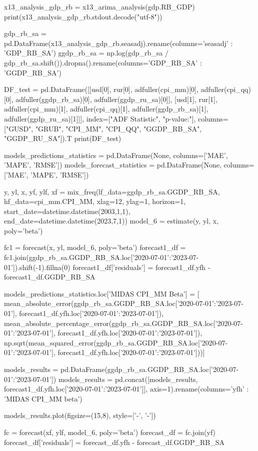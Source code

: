 \documentclass[a4paper, 12pt]{extarticle}
\numberwithin{equation}{subsection}
\begin{document}
\begin{python}
		x13_analysis_gdp_rb = x13_arima_analysis(gdp.RB_GDP)
		print(x13_analysis_gdp_rb.stdout.decode("utf-8"))
		
		gdp_rb_sa = pd.DataFrame(x13_analysis_gdp_rb.seasadj).rename(columns={'seasadj' : 'GDP_RB_SA'})
		ggdp_rb_sa = np.log(gdp_rb_sa / gdp_rb_sa.shift()).dropna().rename(columns={'GDP_RB_SA' : 'GGDP_RB_SA'})
		
		DF_test = pd.DataFrame([[usd[0], rur[0], adfuller(cpi_mm)[0], adfuller(cpi_qq)[0], adfuller(ggdp_rb_sa)[0], adfuller(ggdp_ru_sa)[0]], 
		[usd[1], rur[1], adfuller(cpi_mm)[1], adfuller(cpi_qq)[1], adfuller(ggdp_rb_sa)[1], adfuller(ggdp_ru_sa)[1]]], 
		index=["ADF Statistic", "p-value:"], 
		columns=["GUSD", "GRUB", "CPI_MM", "CPI_QQ", "GGDP_RB_SA", "GGDP_RU_SA"]).T
		print(DF_test)
		
		
		models_predictions_statistics = pd.DataFrame(None, columns=['MAE', 'MAPE', 'RMSE'])
		models_forecast_statistics = pd.DataFrame(None, columns=['MAE', 'MAPE', 'RMSE'])
		
		y, yl, x, yf, ylf, xf = mix_freq(lf_data=ggdp_rb_sa.GGDP_RB_SA, 
		hf_data=cpi_mm.CPI_MM, 
		xlag=12,  
		ylag=1, 
		horizon=1,
		start_date=datetime.datetime(2003,1,1),
		end_date=datetime.datetime(2023,7,1))
		model_6 = estimate(y, yl, x, poly='beta')
		
		fc1 = forecast(x, yl, model_6, poly='beta')
		forecast1_df = fc1.join(ggdp_rb_sa.GGDP_RB_SA.loc['2020-07-01':'2023-07-01']).shift(-1).fillna(0)
		forecast1_df['residuals'] = forecast1_df.yfh - forecast1_df.GGDP_RB_SA
		
		models_predictions_statistics.loc['MIDAS CPI_MM Beta'] = [
		mean_absolute_error(ggdp_rb_sa.GGDP_RB_SA.loc['2020-07-01':'2023-07-01'], forecast1_df.yfh.loc['2020-07-01':'2023-07-01']),
		mean_absolute_percentage_error(ggdp_rb_sa.GGDP_RB_SA.loc['2020-07-01':'2023-07-01'], forecast1_df.yfh.loc['2020-07-01':'2023-07-01']),
		np.sqrt(mean_squared_error(ggdp_rb_sa.GGDP_RB_SA.loc['2020-07-01':'2023-07-01'], forecast1_df.yfh.loc['2020-07-01':'2023-07-01']))]
		
		models_results = pd.DataFrame(ggdp_rb_sa.GGDP_RB_SA.loc['2020-07-01':'2023-07-01'])
		models_results = pd.concat([models_results, forecast1_df.yfh.loc['2020-07-01':'2023-07-01']], axis=1).rename(columns={'yfh' : 'MIDAS CPI_MM beta'})
		
		models_results.plot(figsize=(15,8), style=['-', '-'])
		
		fc = forecast(xf, ylf, model_6, poly='beta')
		forecast_df = fc.join(yf)
		forecast_df['residuals'] = forecast_df.yfh - forecast_df.GGDP_RB_SA
		

\end{python}
\end{document}
